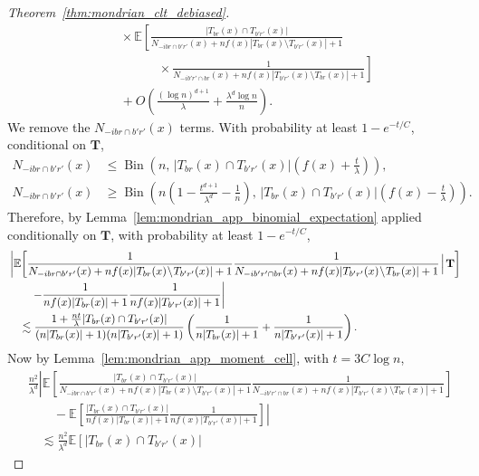 \documentclass[11pt,lof]{puthesis}
\newcommand{\E}{\ensuremath{\mathbb{E}}}
\newcommand{\bT}{\ensuremath{\mathbf{T}}}
\DeclareMathOperator{\Bin}{Bin}
\theoremstyle{break}
\theoremstyle{proof}
\newtheorem{proof}{Proof}
\begin{document}
\begin{proof}[Theorem~\ref{thm:mondrian_clt_debiased}]
\begin{align*}
&\quad\times
\E \left[
\frac{|T_{b r}(x) \cap T_{b' r'}(x)|}
{N_{-i b r \cap b' r'}(x) + n f(x) |T_{b r}(x) \setminus T_{b' r'}(x)|+1}
\right. \\
&\left.
\qquad\qquad
\times
\frac{1}
{N_{-i b' r' \cap b r}(x)+n f(x) |T_{b' r'}(x) \setminus T_{b r}(x)|+1}
\right] \\
&\quad+
O \left(
\frac{(\log n)^{d+1}}{\lambda}
+ \frac{\lambda^d \log n}{n}
\right).
\end{align*}
%
We remove the $N_{-i b r \cap b' r'}(x)$ terms.
With probability at least $1 - e^{-t/C}$, conditional on $\bT$,
%
\begin{align*}
N_{-i b r \cap b' r'}(x)
&\leq \Bin\left(
n, \,
|T_{b r}(x) \cap T_{b' r'}(x)|
\left( f(x) + \frac{t}{\lambda} \right)
\right), \\
N_{-i b r \cap b' r'}(x)
&\geq
\Bin\left(
n
\left( 1 - \frac{t^{d+1}}{\lambda^d}
- \frac{1}{n} \right), \,
|T_{b r}(x) \cap T_{b' r'}(x)|
\left( f(x) - \frac{t}{\lambda} \right)
\right).
\end{align*}
%
Therefore, by Lemma~\ref{lem:mondrian_app_binomial_expectation}
applied conditionally on $\bT$,
with probability at least $1 - e^{-t/C}$,
%
\begin{align*}
&
\left|
\E \! \left[
\frac{1}
{N_{-i b r \cap b' r'}(x)
+ n f(x) |T_{b r}(x) \!\setminus\! T_{b' r'}(x)|+1}
\frac{1}
{N_{-i b' r' \cap b r}(x)
+ n f(x) |T_{b' r'}(x) \!\setminus\! T_{b r}(x)|+1}
\! \Bigm| \! \bT
\right]
\right.
\\
&\left.
\qquad-
\frac{1}
{n f(x) |T_{b r}(x)|+1}
\frac{1}
{n f(x) |T_{b' r'}(x)|+1}
\right| \\
&\quad\lesssim
\frac{1 + \frac{n t}{\lambda} |T_{b r}(x) \cap T_{b' r'}(x)|}
{(n |T_{b r}(x)| + 1)(n |T_{b' r'}(x)| + 1)}
\left(
\frac{1}{n |T_{b r}(x)| + 1}
+ \frac{1}{n |T_{b' r'}(x)| + 1}
\right).
\end{align*}
%
Now by Lemma~\ref{lem:mondrian_app_moment_cell},
with $t = 3 C \log n$,
%
\begin{align*}
&\frac{n^2}{\lambda^d}
\left|
\E \! \left[
\frac{|T_{b r}(x) \cap T_{b' r'}(x)|}
{N_{-i b r \cap b' r'}(x)
+ n f(x) |T_{b r}(x) \!\setminus\! T_{b' r'}(x)|+1}
\frac{1}
{N_{-i b' r' \cap b r}(x)
+ n f(x) |T_{b' r'}(x) \!\setminus\! T_{b r}(x)|+1}
\right]
\right. \\
&\left.
\qquad-
\E \left[
\frac{|T_{b r}(x) \cap T_{b' r'}(x)|}
{n f(x) |T_{b r}(x)|+1}
\frac{1}
{n f(x) |T_{b' r'}(x)|+1}
\right]
\right| \\
&\quad\lesssim
\frac{n^2}{\lambda^d}
\E \left[
|T_{b r}(x) \cap T_{b' r'}(x)|

\end{align*}
\end{proof}
\end{document}
